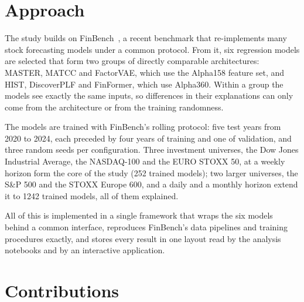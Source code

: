 \section{Approach}
\label{sec:intro_approach}

The study builds on FinBench~\cite{pederzoli2026finbench}, a recent benchmark that re-implements many stock forecasting models under a common protocol. From it, six regression models are selected that form two groups of directly comparable architectures: MASTER, MATCC and FactorVAE, which use the Alpha158 feature set, and HIST, DiscoverPLF and FinFormer, which use Alpha360. Within a group the models see exactly the same inputs, so differences in their explanations can only come from the architecture or from the training randomness.

The models are trained with FinBench's rolling protocol: five test years from 2020 to 2024, each preceded by four years of training and one of validation, and three random seeds per configuration. Three investment universes, the Dow Jones Industrial Average, the NASDAQ-100 and the EURO STOXX 50, at a weekly horizon form the core of the study (252 trained models); two larger universes, the S\&P 500 and the STOXX Europe 600, and a daily and a monthly horizon extend it to 1242 trained models, all of them explained. %

All of this is implemented in a single framework that wraps the six models behind a common interface, reproduces FinBench's data pipelines and training procedures exactly, and stores every result in one layout read by the analysis notebooks and by an interactive application.

\section{Contributions}
\label{sec:intro_contributions}

